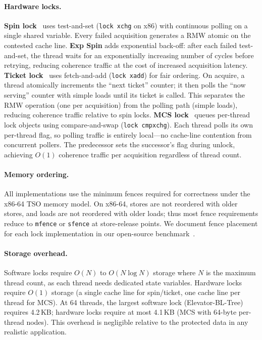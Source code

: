 \paragraph{Hardware locks.}
\textbf{Spin lock}~\cite{andersonPerformanceSpinLock1990} uses test-and-set (\texttt{lock xchg} on x86) with continuous polling on a single shared variable.
Every failed acquisition generates a RMW atomic on the contested cache line.
\textbf{Exp Spin} adds exponential back-off: after each failed test-and-set, the thread waits for an exponentially increasing number of cycles before retrying, reducing coherence traffic at the cost of increased acquisition latency.
\textbf{Ticket lock}~\cite{mellor-crummeyAlgorithmsScalableSynchronization1991} uses fetch-and-add (\texttt{lock xadd}) for fair ordering.
On acquire, a thread atomically increments the ``next ticket'' counter; it then polls the ``now serving'' counter with simple loads until its ticket is called.
This separates the RMW operation (one per acquisition) from the polling path (simple loads), reducing coherence traffic relative to spin locks.
\textbf{MCS lock}~\cite{mellor-crummeyAlgorithmsScalableSynchronization1991} queues per-thread lock objects using compare-and-swap (\texttt{lock cmpxchg}).
Each thread polls its own per-thread flag, so polling traffic is entirely local---no cache-line contention from concurrent pollers.
The predecessor sets the successor's flag during unlock, achieving $O(1)$ coherence traffic per acquisition regardless of thread count.

\paragraph{Memory ordering.}
All implementations use the minimum fences required for correctness under the x86-64 TSO memory model.
On x86-64, stores are not reordered with older stores, and loads are not reordered with older loads; thus most fence requirements reduce to \texttt{mfence} or \texttt{sfence} at store-release points.
We document fence placement for each lock implementation in our open-source benchmark~\cite{ramosEIRNfMutex_benchmark2025}.

\paragraph{Storage overhead.}
Software locks require $O(N)$ to $O(N \log N)$ storage where $N$ is the maximum thread count, as each thread needs dedicated state variables.
Hardware locks require $O(1)$ storage (a single cache line for spin/ticket, one cache line per thread for MCS).
At 64 threads, the largest software lock (Elevator-BL-Tree) requires 4.2\,KB; hardware locks require at most 4.1\,KB (MCS with 64-byte per-thread nodes).
This overhead is negligible relative to the protected data in any realistic application.

